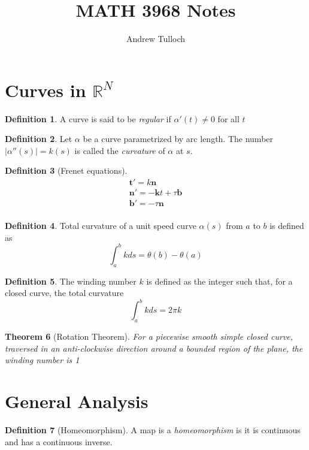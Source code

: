 \documentclass[10pt, oneside, reqno]{amsart}
\title{MATH 3968 Notes}								%
\author{Andrew Tulloch}
\theoremstyle{plain}%
\newtheorem{thm}{Theorem}[section]
\theoremstyle{definition}
\newtheorem{defn}[thm]{Definition}
\theoremstyle{remark}
\begin{document}
\maketitle

\section{Curves in $\mathbb{R}^N$}
\begin{defn}
	A curve is said to be \emph{regular} if $\alpha'(t) \neq 0$ for all $t$
\end{defn}

\begin{defn}
	Let $\alpha$ be a curve parametrized by arc length.  The number $| \alpha''(s)| = k(s)$ is called the \emph{curvature} of $\alpha$ at $s$.
\end{defn}

\begin{defn}[Frenet equations]
	\begin{align*}
		\mathbf{t'} = k \mathbf{n} \\
		\mathbf{n'} = -\mathbf{k}t + \tau \mathbf{b}\\
		\mathbf{b'} = - \tau \mathbf{n}\\
	\end{align*}	
\end{defn}

\begin{defn}
	Total curvature of a unit speed curve $\alpha(s)$ from $a$ to $b$ is defined as \[
		\int_a^b k ds = \theta(b)-\theta(a)
	\]
\end{defn}

\begin{defn}
	The winding number $k$ is defined as the integer such that, for a closed curve, the total curvature \[
		\int_a^b k ds = 2 \pi k
	\]
\end{defn}

\begin{thm}[Rotation Theorem]
	For a piecewise smooth simple closed curve, traversed in an anti-clockwise direction around a bounded region of the plane, the winding number is 1
\end{thm}

\section{General Analysis}
\begin{defn}[Homeomorphism]
	A map is a \emph{homeomorphism} is it is continuous and has a continuous inverse.
\end{defn}
\end{document}
